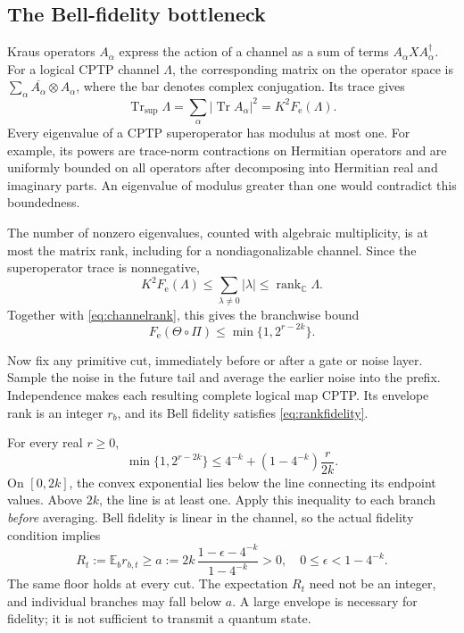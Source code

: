 \documentclass[11pt,a4paper]{article}
\numberwithin{equation}{section}
\theoremstyle{remark}\newtheorem*{remark}{Interpretation}
\newcommand{\Tr}{\operatorname{Tr}}
\newcommand{\rank}{\operatorname{rank}}
\newcommand{\E}{\mathbb E}
\newcommand{\eps}{\epsilon}
\newcommand{\Fe}{F_{\mathrm e}}
\begin{document}
\subsection{The Bell-fidelity bottleneck}
Kraus operators $A_\alpha$ express the action of a channel as a sum of terms $A_\alpha X A_\alpha^\dagger$. For a logical CPTP channel $\Lambda$, the corresponding matrix on the operator space is $\sum_\alpha\overline{A_\alpha}\otimes A_\alpha$, where the bar denotes complex conjugation. Its trace gives
\begin{equation}
\Tr_{\mathrm{sup}}\Lambda
=\sum_\alpha|\Tr A_\alpha|^2
=K^2\Fe(\Lambda).
\end{equation}
Every eigenvalue of a CPTP superoperator has modulus at most one. For example, its powers are trace-norm contractions on Hermitian operators and are uniformly bounded on all operators after decomposing into Hermitian real and imaginary parts. An eigenvalue of modulus greater than one would contradict this boundedness.

The number of nonzero eigenvalues, counted with algebraic multiplicity, is at most the matrix rank, including for a nondiagonalizable channel. Since the superoperator trace is nonnegative,
\begin{equation}
K^2\Fe(\Lambda)
\le\sum_{\lambda\ne0}|\lambda|
\le\rank_{\mathbb C}\Lambda.
\end{equation}
Together with \eqref{eq:channelrank}, this gives the branchwise bound
\begin{equation}
\Fe(\Theta\circ\Pi)\le\min\{1,2^{r-2k}\}.
\label{eq:rankfidelity}
\end{equation}

Now fix any primitive cut, immediately before or after a gate or noise layer. Sample the noise in the future tail and average the earlier noise into the prefix. Independence makes each resulting complete logical map CPTP. Its envelope rank is an integer $r_b$, and its Bell fidelity satisfies \eqref{eq:rankfidelity}.

For every real $r\ge0$,
\begin{equation}
\min\{1,2^{r-2k}\}
\le4^{-k}+(1-4^{-k})\frac r{2k}.
\label{eq:secant}
\end{equation}
On $[0,2k]$, the convex exponential lies below the line connecting its endpoint values. Above $2k$, the line is at least one. Apply this inequality to each branch \emph{before} averaging. Bell fidelity is linear in the channel, so the actual fidelity condition implies
\begin{equation}
R_t:=\E_b r_{b,t}\ge
a:=2k\,\frac{1-\eps-4^{-k}}{1-4^{-k}}>0,
\quad 0\le\eps<1-4^{-k}.
\label{eq:floor}
\end{equation}
The same floor holds at every cut. The expectation $R_t$ need not be an integer, and individual branches may fall below $a$. A large envelope is necessary for fidelity; it is not sufficient to transmit a quantum state.
\end{document}
